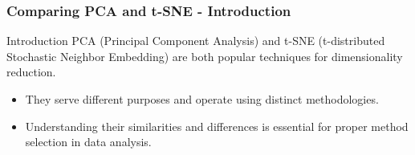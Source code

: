\documentclass[aspectratio=169]{beamer}
\begin{document}
\begin{frame}[fragile]
    \frametitle{Comparing PCA and t-SNE - Introduction}
    \pause
    \begin{block}{Introduction}
        PCA (Principal Component Analysis) and t-SNE (t-distributed Stochastic Neighbor Embedding) are both popular techniques for dimensionality reduction. 
        \begin{itemize}
            \item They serve different purposes and operate using distinct methodologies.
            \item Understanding their similarities and differences is essential for proper method selection in data analysis.
        \end{itemize}
    \end{block}
\end{frame}
\end{document}
